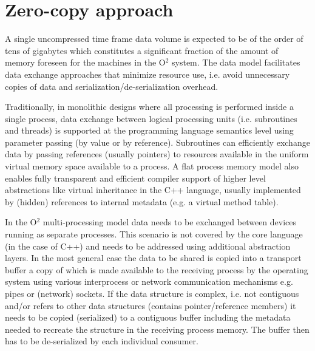 \documentclass[a4paper,twoside]{article}
\def\O2{O$^2$}
\begin{document}
%

\section{Zero-copy approach}

A single uncompressed time frame data volume is expected to be of the order of tens of gigabytes which constitutes a significant fraction of the amount of memory foreseen for the machines in the \O2 system. The data model facilitates data exchange approaches that minimize resource use, i.e. avoid unnecessary copies of data and serialization/de-serialization overhead.

Traditionally, in monolithic designs where all processing is performed inside a single process, data exchange between logical processing units (i.e. subroutines and threads) is supported at the programming language semantics level using parameter passing (by value or by reference).
Subroutines can efficiently exchange data by passing references (usually pointers) to resources available in the uniform virtual memory space available to a process.
A flat process memory model also enables fully transparent and efficient compiler support of higher level abstractions like virtual inheritance in the C++ language, usually implemented by (hidden) references to internal metadata (e.g. a virtual method table).

In the \O2 multi-processing model data needs to be exchanged between devices running as separate processes. This scenario is not covered by the core language (in the case of C++) and needs to be addressed using additional abstraction layers. In the most general case the data to be shared is copied into a transport buffer a copy of which is made available to the receiving process by the operating system using various interprocess or network communication mechanisms e.g. pipes or (network) sockets. 
If the data structure is complex, i.e. not contiguous and/or refers to other data structures (contains pointer/reference members) it needs to be copied (serialized) to a contiguous buffer including the metadata needed to recreate the structure in the receiving process memory.
The buffer then has to be de-serialized by each individual consumer.
\end{document}
